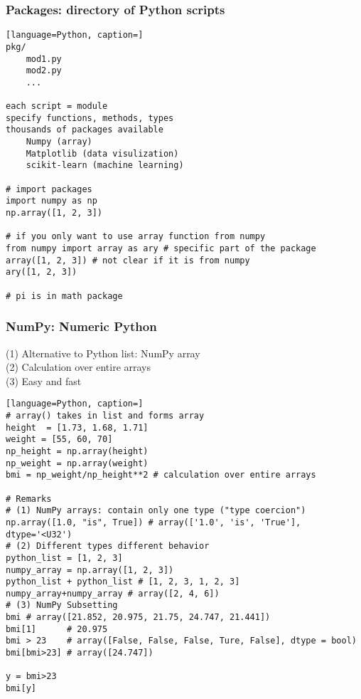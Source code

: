 \documentclass[12pt]{article}
\begin{document}
\subsubsection{\normalsize Packages: directory of Python scripts}
\begin{lstlisting}[language=Python, caption=]
pkg/
    mod1.py
    mod2.py
    ...

each script = module
specify functions, methods, types
thousands of packages available
    Numpy (array)
    Matplotlib (data visulization)
    scikit-learn (machine learning)
    
# import packages
import numpy as np
np.array([1, 2, 3])

# if you only want to use array function from numpy
from numpy import array as ary # specific part of the package
array([1, 2, 3]) # not clear if it is from numpy
ary([1, 2, 3])

# pi is in math package
\end{lstlisting}

\subsubsection{\normalsize NumPy: Numeric Python}
(1) Alternative to Python list: NumPy array\\
(2) Calculation over entire arrays\\
(3) Easy and fast

\begin{lstlisting}[language=Python, caption=]
# array() takes in list and forms array
height  = [1.73, 1.68, 1.71]
weight = [55, 60, 70]
np_height = np.array(height)
np_weight = np.array(weight)
bmi = np_weight/np_height**2 # calculation over entire arrays

# Remarks
# (1) NumPy arrays: contain only one type ("type coercion")
np.array([1.0, "is", True]) # array(['1.0', 'is', 'True'], dtype='<U32')
# (2) Different types different behavior
python_list = [1, 2, 3]
numpy_array = np.array([1, 2, 3])
python_list + python_list # [1, 2, 3, 1, 2, 3]
numpy_array+numpy_array # array([2, 4, 6])
# (3) NumPy Subsetting
bmi # array([21.852, 20.975, 21.75, 24.747, 21.441])
bmi[1]      # 20.975
bmi > 23    # array([False, False, False, Ture, False], dtype = bool)
bmi[bmi>23] # array([24.747])

y = bmi>23
bmi[y]
\end{lstlisting}
\end{document}
